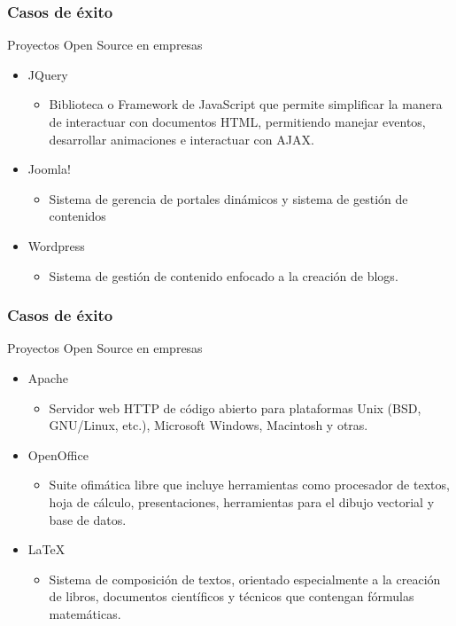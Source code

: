 \frame
{
\frametitle{Casos de éxito}
\Large{Proyectos Open Source en empresas}
\normalsize
\begin{itemize}
	\item JQuery
	\begin{itemize}
		\item Biblioteca o Framework de JavaScript que permite simplificar la manera de interactuar con documentos
			HTML, permitiendo manejar eventos, desarrollar animaciones e interactuar con AJAX.
	\end{itemize}
	\item Joomla!
	\begin{itemize}
		\item Sistema de gerencia de portales dinámicos y sistema de gestión de contenidos
	\end{itemize}
	\item Wordpress
	\begin{itemize}
		\item Sistema de gestión de contenido enfocado a la creación de blogs.
	\end{itemize}
\end{itemize}
}

\frame
{
\frametitle{Casos de éxito}
\Large{Proyectos Open Source en empresas}
\normalsize
\begin{itemize}
	\item Apache
	\begin{itemize}
		\item Servidor web HTTP de código abierto para plataformas Unix (BSD, GNU/Linux, etc.), Microsoft Windows,
			Macintosh y otras.
	\end{itemize}
	\item OpenOffice
	\begin{itemize}
		\item Suite ofimática libre que incluye herramientas como procesador de textos, hoja de cálculo,
			presentaciones, herramientas para el dibujo vectorial y base de datos.
	\end{itemize}
	\item \LaTeX
	\begin{itemize}
		\item Sistema de composición de textos, orientado especialmente a la creación de libros,
			documentos científicos y técnicos que contengan fórmulas matemáticas.
	\end{itemize}	
\end{itemize}
}

